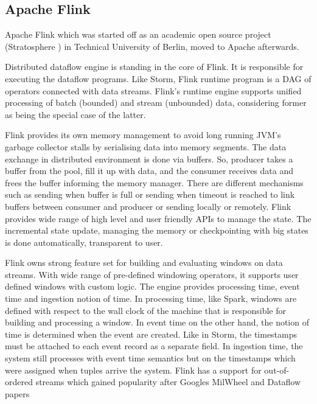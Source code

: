 \subsection{Apache Flink}
Apache Flink  which was started off as an academic open source project (Stratosphere \cite{alexandrov2014stratosphere}) in Technical University of  Berlin, moved to Apache afterwards.

Distributed dataflow engine is standing in the core of Flink. It is responsible for executing the dataflow programs. Like Storm, Flink runtime program is a DAG of  operators connected with data streams. Flink's runtime engine supports unified processing of batch (bounded) and stream (unbounded) data, considering former as being the special case of the latter.

Flink provides its own memory management to avoid long running JVM's garbage collector stalls by serialising data into memory segments. 
The data exchange in distributed environment is done via buffers. So, producer takes a buffer from the pool, fill it up with data, and the consumer receives data and frees the buffer informing the memory manager. There are different mechanisms such as sending when buffer is full or sending when timeout is reached to link buffers between consumer and producer or sending locally or remotely. Flink provides wide range of high level and user friendly APIs to manage the state. The incremental state update, managing the memory or checkpointing with big states is done automatically, transparent to user. 

Flink owns strong feature set for building and evaluating windows on data streams. With wide range of pre-defined windowing operators, it supports user defined windows with custom logic. The engine provides processing time, event time and ingestion notion of time.  In processing time, like Spark,  windows are defined with respect to the wall clock of the machine that is responsible for building and processing  a window. In event time on the other hand, the notion of time is  determined when the event are created. Like in Storm, the timestamps must be attached to each event record as a separate field. In ingestion time, the system still processes with event time semantics but on the timestamps which were assigned when tuples arrive the system. Flink has a support for out-of-ordered streams which gained popularity after Googles MilWheel and Dataflow papers \cite{akidau2013millwheel,akidau2015dataflow}
